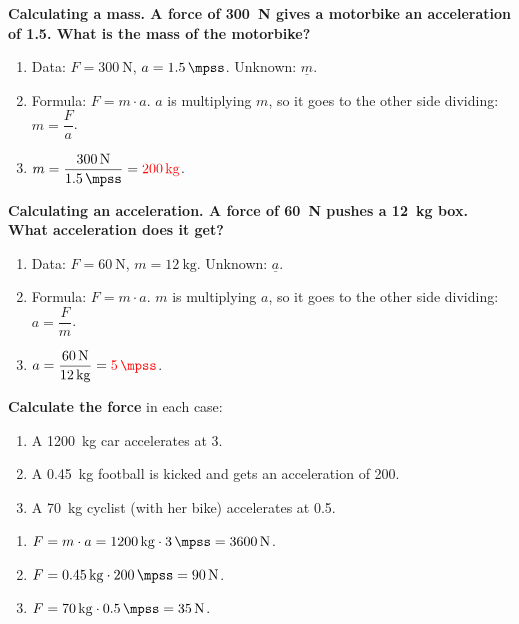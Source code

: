 \begin{example}
    \textbf{Calculating a mass. A force of \qty{300}{\newton} gives a motorbike an acceleration of \qty{1.5}{\mpss}. What is the mass of the motorbike?}
    \begin{enumerate}[label=\numberballmDarkTeal]
        \item Data: \(F = \qty{300}{\newton}\), \(a = \qty{1.5}{\mpss}\). Unknown: \(\underline{m}\).
        \item Formula: \(F = m \cdot a\). \(a\) is multiplying \(m\), so it goes to the other side dividing: \(m = \dfrac{F}{a}\).
        \item \(m = \dfrac{\qty{300}{\newton}}{\qty{1.5}{\mpss}} = \textcolor{red}{\qty{200}{\kg}}\).
    \end{enumerate}
\end{example}

\begin{example}
    \textbf{Calculating an acceleration. A force of \qty{60}{\newton} pushes a \qty{12}{\kg} box. What acceleration does it get?}
    \begin{enumerate}[label=\numberballmDarkTeal]
        \item Data: \(F = \qty{60}{\newton}\), \(m = \qty{12}{\kg}\). Unknown: \(\underline{a}\).
        \item Formula: \(F = m \cdot a\). \(m\) is multiplying \(a\), so it goes to the other side dividing: \(a = \dfrac{F}{m}\).
        \item \(a = \dfrac{\qty{60}{\newton}}{\qty{12}{\kg}} = \textcolor{red}{\qty{5}{\mpss}}\).
    \end{enumerate}
\end{example}

\begin{exercise}
    \textbf{Calculate the force} in each case:
    \begin{enumerate}[label=\letraminuscula]
        \item A \qty{1200}{\kg} car accelerates at \qty{3}{\mpss}.
        \item A \qty{0.45}{\kg} football is kicked and gets an acceleration of \qty{200}{\mpss}.
        \item A \qty{70}{\kg} cyclist (with her bike) accelerates at \qty{0.5}{\mpss}.
    \end{enumerate}
    \begin{solu}
        \begin{enumerate}[label=\alph*)]
            \item \(F = m \cdot a = \qty{1200}{\kg} \cdot \qty{3}{\mpss} = \qty{3600}{\newton}\).
            \item \(F = \qty{0.45}{\kg} \cdot \qty{200}{\mpss} = \qty{90}{\newton}\).
            \item \(F = \qty{70}{\kg} \cdot \qty{0.5}{\mpss} = \qty{35}{\newton}\).
        \end{enumerate}
    \end{solu}
\end{exercise}

